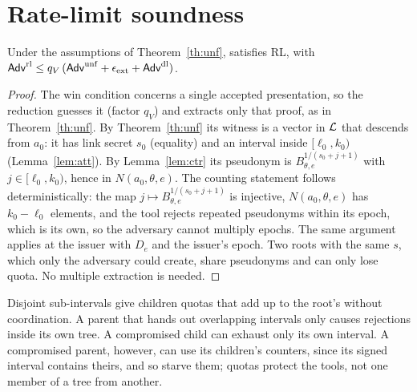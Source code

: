\section{Rate-limit soundness}\label{s:rl}
\begin{theorem}\label{th:rl}
Under the assumptions of Theorem~\ref{th:unf}, \sys{} satisfies RL, with $\mathsf{Adv}^{\mathrm{rl}}\le q_V\,(\mathsf{Adv}^{\mathrm{unf}}+\epsilon_{\mathrm{ext}}+\mathsf{Adv}^{\mathrm{dl}})$.
\end{theorem}
\begin{proof}
The win condition concerns a single accepted presentation, so the reduction guesses it (factor $q_V$) and extracts only that proof, as in Theorem~\ref{th:unf}. By Theorem~\ref{th:unf} its witness is a vector in $\mathcal{L}$ that descends from $a_0$: it has link secret $s_0$ (equality) and an interval inside $[\ell_0,k_0)$ (Lemma~\ref{lem:att}). By Lemma~\ref{lem:ctr} its pseudonym is $B_{\theta,e}^{1/(s_0+j+1)}$ with $j\in[\ell_0,k_0)$, hence in $N(a_0,\theta,e)$. The counting statement follows deterministically: the map $j\mapsto B_{\theta,e}^{1/(s_0+j+1)}$ is injective, $N(a_0,\theta,e)$ has $k_0-\ell_0$ elements, and the tool rejects repeated pseudonyms within its epoch, which is its own, so the adversary cannot multiply epochs. The same argument applies at the issuer with $D_e$ and the issuer's epoch. Two roots with the same $s$, which only the adversary could create, share pseudonyms and can only lose quota. No multiple extraction is needed.
\end{proof}
Disjoint sub-intervals give children quotas that add up to the root's without coordination. A parent that hands out overlapping intervals only causes rejections inside its own tree. A compromised child can exhaust only its own interval. A compromised parent, however, can use its children's counters, since its signed interval contains theirs, and so starve them; quotas protect the tools, not one member of a tree from another.

